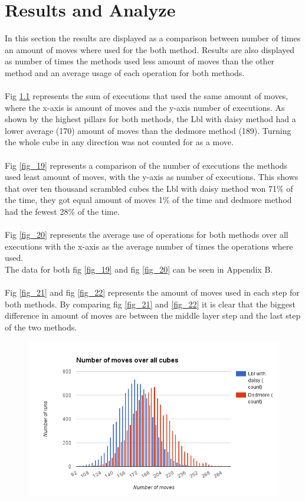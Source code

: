 \documentclass[a4paper,11pt]{kth-mag}
\begin{document}
\chapter{Results and Analyze}
In this section the results are displayed as a comparison between number of times an amount of moves where used for the both method. Results are also displayed as number of times the methods used less amount of moves than the other method and an average usage of each operation for both methods.\\\\ 
Fig \ref{fig_18} represents the sum of executions that used the same amount of moves, where the x-axis is amount of moves and the y-axis number of executions. 
As shown by the highest pillars for both methods, the Lbl with daisy method had a lower average (170) amount of moves than the dedmore method (189). Turning the whole cube in any direction was not counted for as a move.\\\\
Fig \ref{fig_19} represents a comparison of the number of executions the methods used least amount of moves, with the y-axis as number of executions. 
This shows that over ten thousand scrambled cubes the Lbl with daisy method won 71\% of the time, they got equal amount of moves 1\% of the time and dedmore method had the fewest 28\% of the time.\\\\
Fig \ref{fig_20} represents the average use of operations for both methods over all executions with the x-axis as the average number of times the operations where used. \\The data for both fig \ref{fig_19} and fig \ref{fig_20} can be seen in Appendix B.\\\\ 
Fig \ref{fig_21} and fig \ref{fig_22} represents the amount of moves used in each step for both methods. By comparing fig \ref{fig_21} and \ref{fig_22} it is clear that the biggest difference in amount of moves are between the middle layer step and the last step of the two methods.
\begin{figure}[h!]
	\centering
	\includegraphics[width= 1.1\textwidth]{figs/graphone.png}
	\caption{}
	\label{fig_18}
\end{figure}
\end{document}
